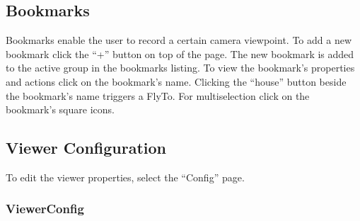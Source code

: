 
\subsection{Bookmarks}
\label{sec:bookmarks}

	
Bookmarks enable the user to record a certain camera viewpoint.
To add a new bookmark click the ``+'' button on top of the page. The new bookmark is added to the active group in the bookmarks listing.
To view the bookmark's properties and actions click on the bookmark's name. Clicking the ``house'' button beside the bookmark's name triggers a FlyTo. For multiselection click on the bookmark's square icons.

\subsection{Viewer Configuration}
\label{sec:config}

To edit the viewer properties, select the ``Config'' page.

\subsubsection{ViewerConfig} 

